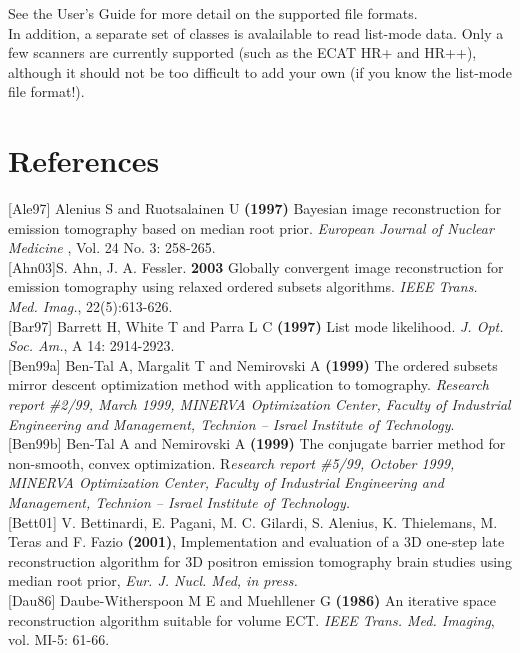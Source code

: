 \documentclass{article}
\begin{document}
See the User's Guide for more detail on the supported file formats.\\
In addition, a separate set of classes is avalailable
to read list-mode 
data. Only a few scanners are currently supported (such as the 
ECAT HR+ and HR++), although it should not be too difficult to 
add your own (if you know the list-mode file format!). 



\section{
References}

{[}Ale97{]} Alenius S and Ruotsalainen U \textbf{(1997)} Bayesian image 
reconstruction for emission tomography based on median root prior. \textit{European 
Journal of Nuclear Medicine} , Vol. 24 No. 3: 258-265.\\
{[}Ahn03{]}S. Ahn, J. A. Fessler. \textbf{2003}
Globally convergent image reconstruction for emission tomography using relaxed ordered subsets algorithms. 
\textit{IEEE Trans. Med. Imag.}, 22(5):613-626. \\
{[}Bar97{]} Barrett H, White T and Parra L C \textbf{(1997)} List mode 
likelihood. \textit{J. Opt. Soc. Am.}, A 14: 2914-2923.\\
{[}Ben99a{]} Ben-Tal A, Margalit T and Nemirovski A \textbf{(1999)} The 
ordered subsets mirror descent optimization method with application 
to tomography. \textit{Research report \#2/99, March 1999, MINERVA 
Optimization Center, Faculty of Industrial Engineering and Management, 
Technion -- Israel Institute of Technology}.\\
{[}Ben99b{]} Ben-Tal A and Nemirovski A \textbf{(1999)} The conjugate 
barrier method for non-smooth, convex optimization. R\textit{esearch 
report \#5/99, October 1999, MINERVA Optimization Center, Faculty 
of Industrial Engineering and Management, Technion -- Israel Institute 
of Technology.}\\
{[}Bett01{]} V. Bettinardi, E. Pagani, M. C. Gilardi, S. Alenius, 
K. Thielemans, M. Teras and F. Fazio \textbf{(2001)}, Implementation 
and evaluation of a 3D one-step late reconstruction algorithm 
for 3D positron emission tomography brain studies using median 
root prior, \textit{Eur. J. Nucl. Med, in press.}\\
{[}Dau86{]} Daube-Witherspoon M E and Muehllener G \textbf{(1986)} An 
iterative space reconstruction algorithm suitable for volume 
ECT. \textit{IEEE Trans. Med. Imaging}, vol. MI-5: 61-66.\\
\end{document}
